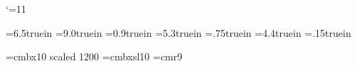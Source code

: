 %
%
%     
%
% 
%
%

\catcode`\@=11

\newskip\interTAGskip

\newbox\TAGbox          \newbox\INFObox
\newdimen\TAGboxhsize   \newdimen\INFOboxhsize  \newdimen\INFOboxlength
\newdimen\DATEhsize     \newdimen\DATEINFOhsize \newdimen\@datesepamount
\hsize=6.5truein        \vsize=9.0truein        \interTAGskip=12pt
\parindent=0pt          
\TAGboxhsize=0.9truein  \INFOboxhsize=5.3truein %
\DATEhsize=.75truein    \DATEINFOhsize=4.4truein %
\@datesepamount=.15truein                        %
\let\wheretoputit=c     \let\\=\cr
\nopagenumbers

\font\NAMEfont=cmbx10 scaled 1200   \font\TAGfont=cmbxsl10
\font\smallADDRESSfont=cmr9

